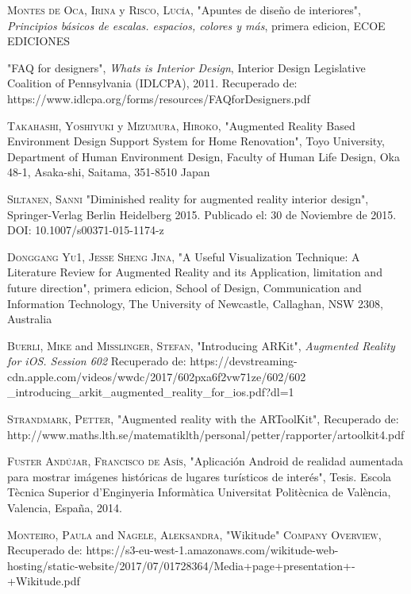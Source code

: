 \begin{thebibliography}{X}
	
	 \textsc{Montes de Oca, Irina} y \textsc{Risco, Lucía},
	"Apuntes de diseño de interiores",
	\textit{Principios básicos de escalas. espacios, colores y más}, primera edicion,
	ECOE EDICIONES
	
	 "FAQ for designers", \textit{Whats is Interior Design}, Interior Design Legislative Coalition of Pennsylvania (IDLCPA), 2011. Recuperado de: https://www.idlcpa.org/forms/resources/FAQforDesigners.pdf
	
	 \textsc{Takahashi, Yoshiyuki} y \textsc{Mizumura, Hiroko},
	"Augmented Reality Based Environment Design Support System for Home Renovation", Toyo  University, Department of Human Environment Design, Faculty of Human Life Design, Oka 48-1, Asaka-shi, Saitama, 351-8510 Japan 
	
	 \textsc{Siltanen, Sanni} "Diminished reality for augmented reality interior design", Springer-Verlag Berlin Heidelberg 2015. Publicado el: 30 de Noviembre de 2015. DOI: 10.1007/s00371-015-1174-z
	
	 \textsc{Donggang Yu1, Jesse Sheng Jina},
	"A Useful Visualization Technique: A Literature Review for Augmented Reality and its Application, limitation and future direction", primera edicion,
	School of Design, Communication and Information Technology, The University of Newcastle, Callaghan, NSW 2308, Australia
	
	 \textsc{Buerli, Mike} and \textsc{Misslinger, Stefan}, "Introducing ARKit", \textit{Augmented Reality for iOS. Session 602} Recuperado de: https://devstreaming-cdn.apple.com/videos/wwdc/2017/602pxa6f2vw71ze/602/602
	\_introducing\_arkit\_augmented\_reality\_for\_ios.pdf?dl=1
	
	 \textsc{Strandmark, Petter}, "Augmented reality with the ARToolKit", Recuperado de: http://www.maths.lth.se/matematiklth/personal/petter/rapporter/artoolkit4.pdf
	
	 \textsc{Fuster Andújar, Francisco de Asís}, "Aplicación Android de realidad aumentada para mostrar imágenes históricas de lugares turísticos de interés", Tesis. Escola Tècnica Superior d’Enginyeria Informàtica Universitat Politècnica de València, Valencia, España, 2014.
	
	 \textsc{Monteiro, Paula} and \textsc{Nagele, Aleksandra}, "Wikitude" \textsc{Company Overview}, Recuperado de: https://s3-eu-west-1.amazonaws.com/wikitude-web-hosting/static-website/2017/07/01728364/Media+page+presentation+-+Wikitude.pdf
	

\end{thebibliography}
